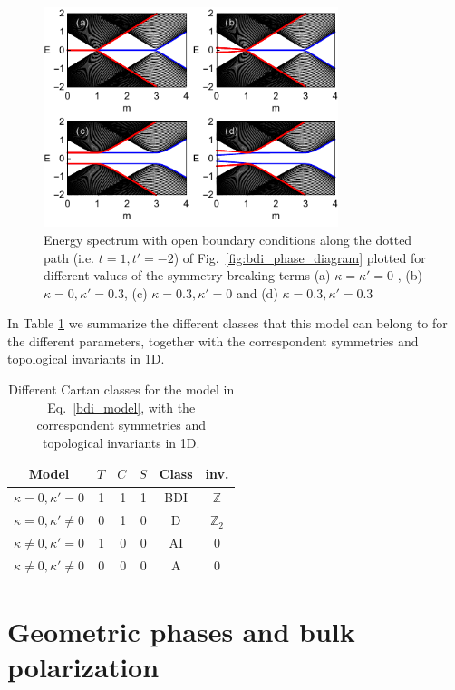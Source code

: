 \documentclass[twocolumn,amsmath,longbibliography,amssymb,superscriptaddress]{revtex4-1}
\begin{document}
\begin{figure}[h!]
\centering
\includegraphics[width=86mm]{fig2comp.pdf}
\caption{Energy spectrum with open boundary conditions along the dotted path (i.e. $t=1,t'=-2$) of Fig.~\ref{fig:bdi_phase_diagram} plotted for different values of the symmetry-breaking terms (a) $\kappa =\kappa'=0$ , (b) $\kappa = 0, \kappa'=0.3$, (c) $\kappa = 0.3,\kappa'=0$ and (d) $\kappa = 0.3,\kappa'=0.3$}
\label{fig:zero_E_modes}
\end{figure}

In Table \ref{fig:class_table} we summarize the different classes that this model can belong to for the different parameters, together with the correspondent symmetries and topological invariants in 1D. 


\begin{table}[h]
\centering 
\begin{tabular}{|c |rrr| c|c|} 
\hline\hline 
Model &  $T$ & $C$ & $S$ & Class & inv.  \\  [1ex] 
\hline
$\kappa =0,\kappa'=0$ &  1 & 1 & 1 & BDI  & $\mathbb{Z}$\\  [1ex] 
$\kappa =0,\kappa' \neq0$ &  0 & 1 & 0 & D  & $\mathbb{Z}_2$ \\  [1ex] 
$\kappa \neq 0,\kappa'=0$ &  1 & 0 & 0 & AI & 0 \\  [1ex] 
$\kappa \neq 0,\kappa' \neq 0$ &  0 & 0 & 0 & A & 0  \\  [1ex] 
\hline \hline
\end{tabular}
\caption{Different Cartan classes for the model in Eq.~\eqref{bdi_model}, with the correspondent symmetries and topological invariants in 1D.} 
\label{fig:class_table}
\end{table}


\section{Geometric phases and bulk polarization}
\end{document}
